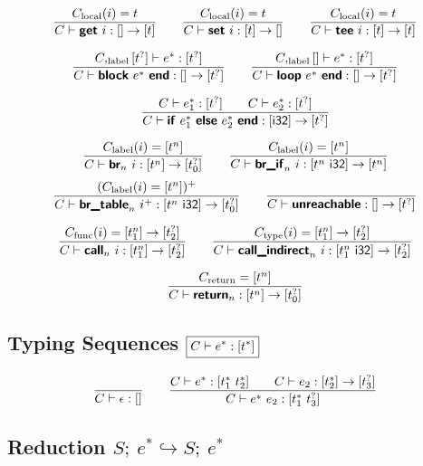 \documentclass[a4paper]{scrartcl}
\newcommand\f[1]{\ensuremath{\mathop{\mathrm{#1\null}}\nolimits}\xspace}
\newcommand\evalto{\hookrightarrow}
\newcommand\K[1]{\ensuremath{\textsf{#1}}}
\newcommand\KK[1]{\ensuremath{\K{\textbf{#1}}}}
\begin{document}
$$
\frac{
  C_{\f{local}}(i) = t
}{
  C \vdash \KK{get}~i : [] \to [t]
}
\qquad
\frac{
  C_{\f{local}}(i) = t
}{
  C \vdash \KK{set}~i : [t] \to []
}
\qquad
\frac{
  C_{\f{local}}(i) = t
}{
  C \vdash \KK{tee}~i : [t] \to [t]
}
$$

$$
\frac{
  C,_{\f{label}}[t^?] \vdash e^\ast : [t^?]\orbot
}{
  C \vdash \KK{block}~e^\ast~\KK{end} : [] \to [t^?]\orbot
}
\qquad
\frac{
  C,_{\f{label}}[] \vdash e^\ast : [t^?]\orbot
}{
  C \vdash \KK{loop}~e^\ast~\KK{end} : [] \to [t^?]\orbot
}
$$

$$
\frac{
  C \vdash e_1^\ast : [t^?]\orbot
  \qquad
  C \vdash e_2^\ast : [t^?]\orbot
}{
  C \vdash \KK{if}~e_1^\ast~\KK{else}~e_2^\ast~\KK{end} : [\K{i32}] \to [t^?]\orbot
}
$$

$$
\frac{
  C_{\f{label}}(i) = [t^n]
}{
  C \vdash \KK{br}_n~i : [t^n] \to \poly{t_0^?}
}
\qquad
\frac{
  C_{\f{label}}(i) = [t^n]
}{
  C \vdash \KK{br\_if}_n~i : [t^n~\K{i32}] \to [t^n]
}
$$
$$
\frac{
  (C_{\f{label}}(i) = [t^n])^+
}{
  C \vdash \KK{br\_table}_n~i^+ : [t^n~\K{i32}] \to \poly{t_0^?}
}
\qquad
\frac{
}{
  C \vdash \KK{unreachable} : [] \to \poly{t^?}
}
$$

$$
\frac{
  C_{\f{func}}(i) = [t_1^n] \to [t_2^?]
}{
  C \vdash \KK{call}_n~i : [t_1^n] \to [t_2^?]
}
\qquad
\frac{
  C_{\f{type}}(i) = [t_1^n] \to [t_2^?]
}{
  C \vdash \KK{call\_indirect}_n~i : [t_1^n~\K{i32}] \to [t_2^?]
}
$$

$$
\frac{
  C_{\f{return}} = [t^n]
}{
  C \vdash \KK{return}_n : [t^n] \to \poly{t_0^?}
}
$$


\subsection*{Typing Sequences \hfill $\boxed{C \vdash e^\ast : [t^\ast]}$}

$$
\frac{
}{
  C \vdash \epsilon : []
}
\qquad
\frac{
  C \vdash e^\ast : [t_1^\ast~t_2^\ast]
  \qquad
  C \vdash e_2 : [t_2^\ast] \to [t_3^?]\orbot
}{
  C \vdash e^\ast~e_2 : [t_1^\ast~t_3^?]\orbot
}
\botrule{
\qquad
\frac{
  C \vdash e^\ast : \bot
  \qquad
  C \vdash e_2 : [t_2^\ast] \to [t_3^?]/\bot
}{
  C \vdash e^\ast~e_2 : \bot
}
}
$$


\subsection*{Reduction \hfill $\boxed{S;~e^\ast \evalto S;~e^\ast}$}
\end{document}
